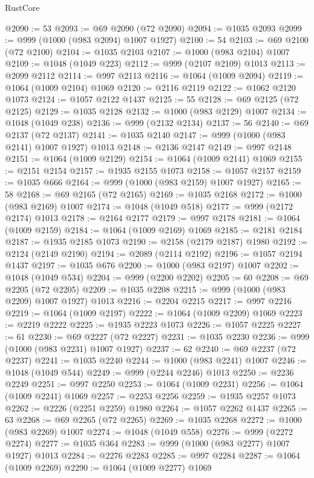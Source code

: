 \begin{lexlean}{RustCore}
\begin{coremodule}
@2090 := 53
@2093 := @69 @2090 (@72 @2090)
@2094 := @1035 @2093
@2099 := @999 (@1000 (@983 @2094) @1007 @1927)
@2100 := 54
@2103 := @69 @2100 (@72 @2100)
@2104 := @1035 @2103
@2107 := @1000 (@983 @2104) @1007
@2109 := @1048 (@1049 @223)
@2112 := @999 (@2107 @2109) @1013
@2113 := @2099 @2112
@2114 := @997 @2113
@2116 := @1064 (@1009 @2094)
@2119 := @1064 (@1009 @2104) @1069
@2120 := @2116 @2119
@2122 := @1062 @2120 @1073
@2124 := @1057 @2122 @1437
@2125 := 55
@2128 := @69 @2125 (@72 @2125)
@2129 := @1035 @2128
@2132 := @1000 (@983 @2129) @1007
@2134 := @1048 (@1049 @238)
@2136 := @999 (@2132 @2134)
@2137 := 56
@2140 := @69 @2137 (@72 @2137)
@2141 := @1035 @2140
@2147 := @999 (@1000 (@983 @2141) @1007 @1927) @1013
@2148 := @2136 @2147
@2149 := @997 @2148
@2151 := @1064 (@1009 @2129)
@2154 := @1064 (@1009 @2141) @1069
@2155 := @2151 @2154
@2157 := @1935 @2155 @1073
@2158 := @1057 @2157
@2159 := @1035 @666
@2164 := @999 (@1000 (@983 @2159) @1007 @1927)
@2165 := 58
@2168 := @69 @2165 (@72 @2165)
@2169 := @1035 @2168
@2172 := @1000 (@983 @2169) @1007
@2174 := @1048 (@1049 @518)
@2177 := @999 (@2172 @2174) @1013
@2178 := @2164 @2177
@2179 := @997 @2178
@2181 := @1064 (@1009 @2159)
@2184 := @1064 (@1009 @2169) @1069
@2185 := @2181 @2184
@2187 := @1935 @2185 @1073
@2190 := @2158 (@2179 @2187) @1980
@2192 := @2124 (@2149 @2190)
@2194 := @2089 (@2114 @2192)
@2196 := @1057 @2194 @1437
@2197 := @1035 @676
@2200 := @1000 (@983 @2197) @1007
@2202 := @1048 (@1049 @534)
@2204 := @999 (@2200 @2202)
@2205 := 60
@2208 := @69 @2205 (@72 @2205)
@2209 := @1035 @2208
@2215 := @999 (@1000 (@983 @2209) @1007 @1927) @1013
@2216 := @2204 @2215
@2217 := @997 @2216
@2219 := @1064 (@1009 @2197)
@2222 := @1064 (@1009 @2209) @1069
@2223 := @2219 @2222
@2225 := @1935 @2223 @1073
@2226 := @1057 @2225
@2227 := 61
@2230 := @69 @2227 (@72 @2227)
@2231 := @1035 @2230
@2236 := @999 (@1000 (@983 @2231) @1007 @1927)
@2237 := 62
@2240 := @69 @2237 (@72 @2237)
@2241 := @1035 @2240
@2244 := @1000 (@983 @2241) @1007
@2246 := @1048 (@1049 @544)
@2249 := @999 (@2244 @2246) @1013
@2250 := @2236 @2249
@2251 := @997 @2250
@2253 := @1064 (@1009 @2231)
@2256 := @1064 (@1009 @2241) @1069
@2257 := @2253 @2256
@2259 := @1935 @2257 @1073
@2262 := @2226 (@2251 @2259) @1980
@2264 := @1057 @2262 @1437
@2265 := 63
@2268 := @69 @2265 (@72 @2265)
@2269 := @1035 @2268
@2272 := @1000 (@983 @2269) @1007
@2274 := @1048 (@1049 @558)
@2276 := @999 (@2272 @2274)
@2277 := @1035 @364
@2283 := @999 (@1000 (@983 @2277) @1007 @1927) @1013
@2284 := @2276 @2283
@2285 := @997 @2284
@2287 := @1064 (@1009 @2269)
@2290 := @1064 (@1009 @2277) @1069

\end{coremodule}
\end{lexlean}

